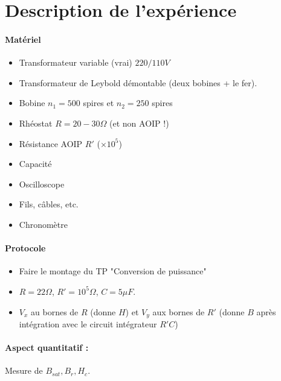 \documentclass[11pt]{report}
\numberwithin{figure}{section}
\numberwithin{equation}{section}
\numberwithin{table}{section}
\newcommand{\1}{\boldsymbol{1}}
\begin{document}
\section*{Description de l'expérience}



\begin{tcolorbox}[breakable, enhanced, colback=red!2!white,colframe=mycolor!85!black,title=\textbf{\textbf{Expérience}}]
\paragraph*{Matériel}
\begin{itemize}
\item Transformateur variable (vrai) $220/110V$
\item Transformateur de Leybold démontable (deux bobines + le fer).
\item Bobine $n_1 = 500$ spires et $n_2 = 250$ spires 
\item Rhéostat $R = 20-30 \Omega$ (et non AOIP !)
\item Résistance AOIP $R'$ ($\times 10^5$)
\item Capacité
\item Oscilloscope
\item Fils, câbles, etc.
\item Chronomètre
\end{itemize}

\paragraph*{Protocole } 

\begin{itemize}[label=$\triangleright$]
		\item Faire le montage du TP "Conversion de puissance"
		\item $R = 22 \Omega$, $R' = 10^5 \Omega$, $C = 5 \mu F$.
		\item $V_x$ au bornes de $R$ (donne $H$) et $V_y$ aux bornes de $R'$ (donne $B$ après intégration avec le circuit intégrateur $R'C$)
\end{itemize}

\paragraph*{Aspect quantitatif :} Mesure de $B_{sat}, B_r, H_c$. 


\end{tcolorbox}
\end{document}
